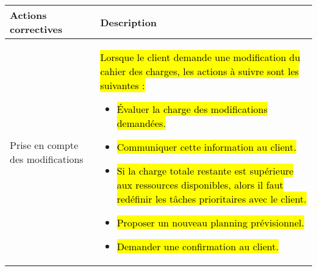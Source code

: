 \begin{center}
\begin{tabular}{|m{5cm}|m{11cm}|}
\hline
\rowcolor[gray]{.8} Actions correctives & Description\\
\hline
Prise en compte des modifications & 
\hl{Lorsque le client demande une modification du cahier des charges, les actions à suivre sont les suivantes :}
\begin{itemize}
\item \hl{Évaluer la charge des modifications demandées.}
\item \hl{Communiquer cette information au client.}
\item \hl{Si la charge totale restante est supérieure aux ressources disponibles, alors il faut redéfinir les tâches prioritaires avec le client.}
\item \hl{Proposer un nouveau planning prévisionnel.}
\item \hl{Demander une confirmation au client.}
\end{itemize}\\


\hline
\end{tabular}
\end{center}


